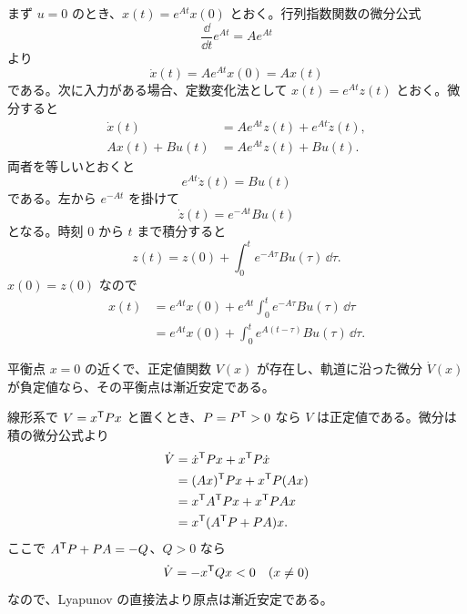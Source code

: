 \begin{derivation}
まず $u=0$ のとき、$x(t)=e^{At}x(0)$ とおく。行列指数関数の微分公式
\begin{equation}
  \frac{\dd}{\dd t}e^{At}=Ae^{At}
\end{equation}
より
\begin{equation}
  \dot{x}(t)=Ae^{At}x(0)=Ax(t)
\end{equation}
である。次に入力がある場合、定数変化法として $x(t)=e^{At}z(t)$ とおく。微分すると
\begin{align}
  \dot{x}(t)&=Ae^{At}z(t)+e^{At}\dot{z}(t),\\
  Ax(t)+Bu(t)&=Ae^{At}z(t)+Bu(t).
\end{align}
両者を等しいとおくと
\begin{equation}
  e^{At}\dot{z}(t)=Bu(t)
\end{equation}
である。左から $e^{-At}$ を掛けて
\begin{equation}
  \dot{z}(t)=e^{-At}Bu(t)
\end{equation}
となる。時刻 $0$ から $t$ まで積分すると
\begin{equation}
  z(t)=z(0)+\int_0^t e^{-A\tau}Bu(\tau)\,\dd\tau.
\end{equation}
$x(0)=z(0)$ なので
\begin{align}
  x(t)&=e^{At}x(0)+e^{At}\int_0^t e^{-A\tau}Bu(\tau)\,\dd\tau\\
  &=e^{At}x(0)+\int_0^t e^{A(t-\tau)}Bu(\tau)\,\dd\tau.
\end{align}
\end{derivation}

\begin{theorem}
平衡点 $x=0$ の近くで、正定値関数 $V(x)$ が存在し、軌道に沿った微分 $\dot{V}(x)$ が負定値なら、その平衡点は漸近安定である。
\end{theorem}

線形系で $V=x^{\mathsf{T}} Px$ と置くとき、$P=P^{\mathsf{T}}>0$ なら $V$ は正定値である。微分は積の微分公式より
\begin{align}
  \dot{V}
  &=\dot{x}^{\mathsf{T}} Px+x^{\mathsf{T}} P\dot{x}\\
  &=(Ax)^{\mathsf{T}} Px+x^{\mathsf{T}} P(Ax)\\
  &=x^{\mathsf{T}} A^{\mathsf{T}} Px+x^{\mathsf{T}} PAx\\
  &=x^{\mathsf{T}}(A^{\mathsf{T}} P+PA)x.
\end{align}
ここで $A^{\mathsf{T}} P+PA=-Q$、$Q>0$ なら
\begin{equation}
  \dot{V}=-x^{\mathsf{T}} Qx<0\quad(x\ne0)
\end{equation}
なので、Lyapunov の直接法より原点は漸近安定である。
